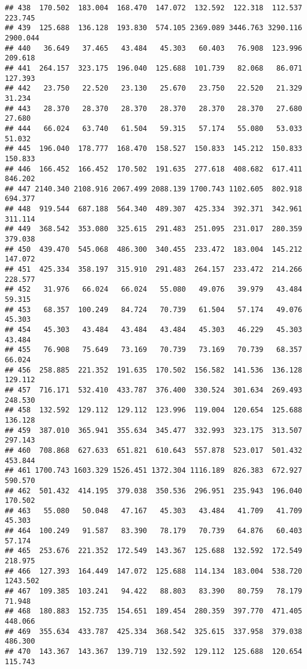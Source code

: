 \documentclass[
]{article}
\begin{document}
\begin{verbatim}
## 438  170.502  183.004  168.470  147.072  132.592  122.318  112.537  223.745
## 439  125.688  136.128  193.830  574.105 2369.089 3446.763 3290.116 2900.044
## 440   36.649   37.465   43.484   45.303   60.403   76.908  123.996  209.618
## 441  264.157  323.175  196.040  125.688  101.739   82.068   86.071  127.393
## 442   23.750   22.520   23.130   25.670   23.750   22.520   21.329   31.234
## 443   28.370   28.370   28.370   28.370   28.370   28.370   27.680   27.680
## 444   66.024   63.740   61.504   59.315   57.174   55.080   53.033   51.032
## 445  196.040  178.777  168.470  158.527  150.833  145.212  150.833  150.833
## 446  166.452  166.452  170.502  191.635  277.618  408.682  617.411  846.202
## 447 2140.340 2108.916 2067.499 2088.139 1700.743 1102.605  802.918  694.377
## 448  919.544  687.188  564.340  489.307  425.334  392.371  342.961  311.114
## 449  368.542  353.080  325.615  291.483  251.095  231.017  280.359  379.038
## 450  439.470  545.068  486.300  340.455  233.472  183.004  145.212  147.072
## 451  425.334  358.197  315.910  291.483  264.157  233.472  214.266  228.577
## 452   31.976   66.024   66.024   55.080   49.076   39.979   43.484   59.315
## 453   68.357  100.249   84.724   70.739   61.504   57.174   49.076   45.303
## 454   45.303   43.484   43.484   43.484   45.303   46.229   45.303   43.484
## 455   76.908   75.649   73.169   70.739   73.169   70.739   68.357   66.024
## 456  258.885  221.352  191.635  170.502  156.582  141.536  136.128  129.112
## 457  716.171  532.410  433.787  376.400  330.524  301.634  269.493  248.530
## 458  132.592  129.112  129.112  123.996  119.004  120.654  125.688  136.128
## 459  387.010  365.941  355.634  345.477  332.993  323.175  313.507  297.143
## 460  708.868  627.633  651.821  610.643  557.878  523.017  501.432  453.844
## 461 1700.743 1603.329 1526.451 1372.304 1116.189  826.383  672.927  590.570
## 462  501.432  414.195  379.038  350.536  296.951  235.943  196.040  170.502
## 463   55.080   50.048   47.167   45.303   43.484   41.709   41.709   45.303
## 464  100.249   91.587   83.390   78.179   70.739   64.876   60.403   57.174
## 465  253.676  221.352  172.549  143.367  125.688  132.592  172.549  218.975
## 466  127.393  164.449  147.072  125.688  114.134  183.004  538.720 1243.502
## 467  109.385  103.241   94.422   88.803   83.390   80.759   78.179   71.948
## 468  180.883  152.735  154.651  189.454  280.359  397.770  471.405  448.066
## 469  355.634  433.787  425.334  368.542  325.615  337.958  379.038  486.300
## 470  143.367  143.367  139.719  132.592  129.112  125.688  120.654  115.743

\end{verbatim}
\end{document}
